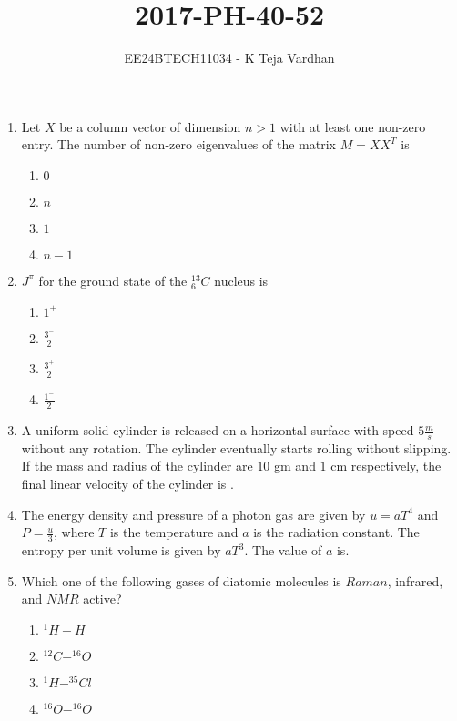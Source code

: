 \documentclass{article}
\newcommand{\gt}{>}
\begin{document}

\title{2017-PH-40-52}
\author{EE24BTECH11034 - K Teja Vardhan}
{\let\newpage\relax\maketitle}

\begin{enumerate}

\item Let $X$ be a column vector of dimension $n \gt 1$ with at least one non-zero entry. The number of non-zero eigenvalues of the matrix $M = XX^T$ is

\begin{enumerate}
    \item $0$
    \item $n$
    \item $1$
    \item $n-1$
\end{enumerate}

\item $J^\pi$ for the ground state of the $^{13}_6C$ nucleus is

\begin{enumerate}
    \item $1^+$
    \item $\frac{3^-}{2}$
    \item $\frac{3^+}{2}$
    \item $\frac{1^-}{2}$
\end{enumerate}

\item A uniform solid cylinder is released on a horizontal surface with speed $5 \frac{m}{s}$ without any rotation. The cylinder eventually starts rolling without slipping. If the mass and radius of the cylinder are $10$ gm and $1$ cm respectively, the final linear velocity of the cylinder is .

\item The energy density and pressure of a photon gas are given by $u = aT^4$ and $P = \frac{u}{3}$, where $T$ is the temperature and $a$ is the radiation constant. The entropy per unit volume is given by $aT^3$. The value of $a$ is.

\item Which one of the following gases of diatomic molecules is $Raman$, infrared, and $NMR$ active?

\begin{enumerate}
    \item $^1H-H$
    \item $^{12}C-^{16}O$
    \item $^1H-^{35}Cl$
    \item $^{16}O-^{16}O$
\end{enumerate}


\end{enumerate}
\end{document}
